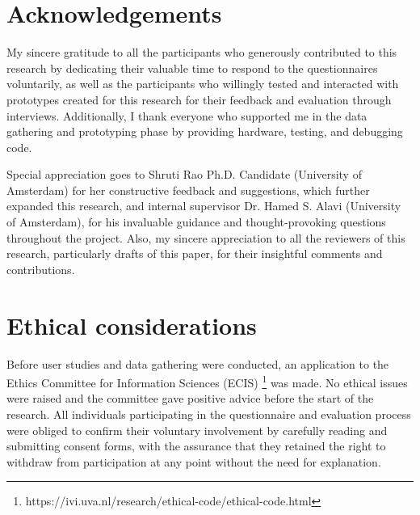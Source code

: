 \onecolumn

\appendix
\begin{appendices}

\section{Acknowledgements}
\label{appendix:acknowledgements}

My sincere gratitude to all the participants who generously contributed to this research by dedicating their valuable time to respond to the questionnaires voluntarily, as well as the participants who willingly tested and interacted with prototypes created for this research for their feedback and evaluation through interviews. Additionally, I thank everyone who supported me in the data gathering and prototyping phase by providing hardware, testing, and debugging code.

Special appreciation goes to Shruti Rao Ph.D. Candidate (University of Amsterdam) for her constructive feedback and suggestions, which further expanded this research, and internal supervisor Dr. Hamed S. Alavi (University of Amsterdam), for his invaluable guidance and thought-provoking questions throughout the project. Also, my sincere appreciation to all the reviewers of this research, particularly drafts of this paper, for their insightful comments and contributions.

\section{Ethical considerations}
\label{appendix:ethical}

Before user studies and data gathering were conducted, an application to the Ethics Committee for Information Sciences (ECIS) \footnote{https://ivi.uva.nl/research/ethical-code/ethical-code.html} was made. No ethical issues were raised and the committee gave positive advice before the start of the research. All individuals participating in the questionnaire and evaluation process were obliged to confirm their voluntary involvement by carefully reading and submitting consent forms, with the assurance that they retained the right to withdraw from participation at any point without the need for explanation.


\end{appendices}
